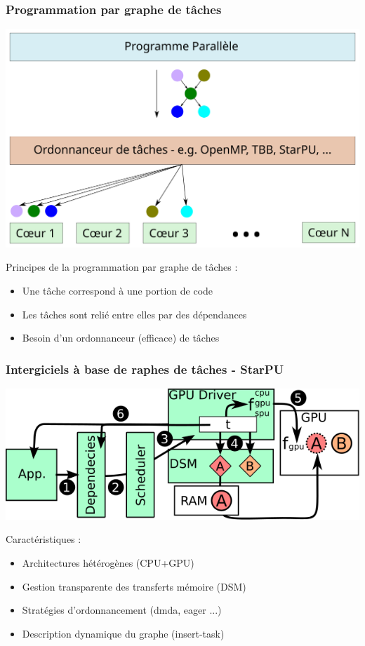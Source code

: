 \documentclass{beamer}
\begin{document}
\begin{frame}
  \frametitle{Programmation par graphe de tâches}

  \centerline{\includegraphics[width=0.8\linewidth]{runtime}}

  Principes de la programmation par graphe de tâches :
  \begin{itemize}
    \item Une tâche correspond à une portion de code
    \item Les tâches sont relié entre elles par des dépendances
    \item Besoin d'un ordonnanceur (efficace) de tâches
  \end{itemize}
\end{frame}


\begin{frame}
  \frametitle{Intergiciels à base de raphes de tâches - StarPU}

  \centerline{\includegraphics[width=0.7\linewidth]{starpu}}

  Caractéristiques :
  \begin{itemize}
    \item Architectures hétérogènes (CPU+GPU)
    \item Gestion transparente des transferts mémoire (DSM)
    \item Stratégies d'ordonnancement (dmda, eager ...)
    \item Description dynamique du graphe (insert-task)
  \end{itemize}

\end{frame}
\end{document}
